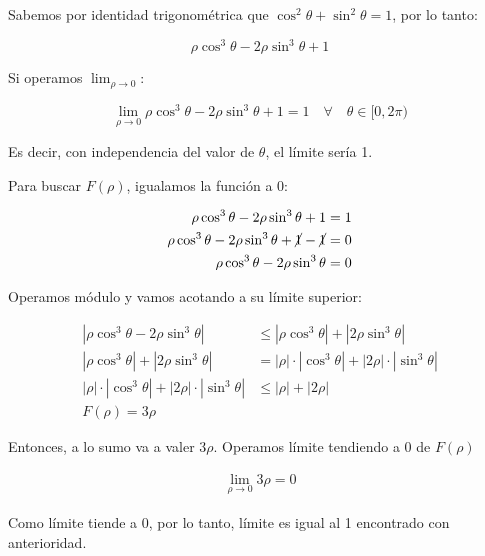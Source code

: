 Sabemos por identidad trigonométrica que
\(\cos^{2}\theta + \sin^{2}\theta = 1\),
por lo tanto:

\begin{equation*}
    \rho\cos^{3}\theta - 2\rho\sin^{3}\theta + 1
\end{equation*}

Si operamos \(\lim_{\rho\to0}\):

\begin{equation*}
    \lim_{\rho\to0}\rho\cos^{3}\theta - 2\rho\sin^{3}\theta + 1 = \boxed{1}
    \quad\forall\quad \theta \in [0,2\pi)
\end{equation*}

Es decir,
con independencia del valor de \(\theta\),
el límite sería 1.

Para buscar \(F(\rho)\), igualamos la función a 0:

\begin{align*}
    \rho\cos^{3}\theta - 2\rho\sin^{3}\theta + 1                       & = 1 \\
    \rho\cos^{3}\theta - 2\rho\sin^{3}\theta + \cancel{1} - \cancel{1} & = 0 \\
    \rho\cos^{3}\theta - 2\rho\sin^{3}\theta                           & = 0 \\
\end{align*}

Operamos módulo y vamos acotando a su límite superior:

\begin{align*}
    |\rho\cos^{3}\theta - 2\rho\sin^{3}\theta|                 & \leq |\rho\cos^{3}\theta| + |2\rho\sin^{3}\theta|            \\
    |\rho\cos^{3}\theta| + |2\rho\sin^{3}\theta|               & = |\rho|\cdot|\cos^{3}\theta| + |2\rho|\cdot|\sin^{3}\theta| \\
    |\rho|\cdot|\cos^{3}\theta| + |2\rho|\cdot|\sin^{3}\theta| & \leq |\rho| + |2\rho|                                        \\
    \boxed{F(\rho) = 3\rho}
\end{align*}

Entonces, a lo sumo va a valer \(3\rho\).
Operamos límite tendiendo a 0 de \(F(\rho)\)

\begin{align*}
    \lim_{\rho\to0} 3\rho = \boxed{0}
\end{align*}

Como límite tiende a 0,
por lo tanto,
límite es igual al 1 encontrado con anterioridad.

